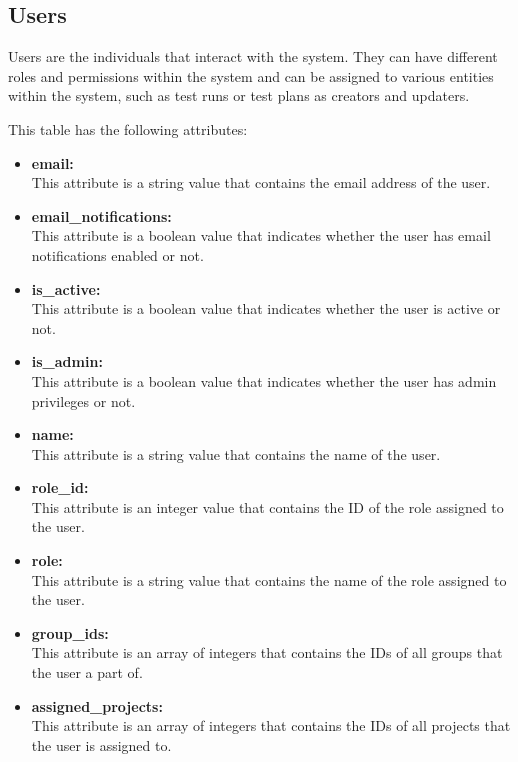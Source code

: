 \subsection{Users}

Users are the individuals that interact with the system. They can have different roles and permissions within the system and can be assigned to various entities within the system, such as test runs or test plans as creators and updaters.

This table has the following attributes:~\cite{TRUsers}
\begin{itemize}
    \item \textbf{email:} \\
    This attribute is a string value that contains the email address of the user.

    \item \textbf{email_notifications:} \\
    This attribute is a boolean value that indicates whether the user has email notifications enabled or not.

    \item \textbf{is_active:} \\
    This attribute is a boolean value that indicates whether the user is active or not.

    \item \textbf{is_admin:} \\
    This attribute is a boolean value that indicates whether the user has admin privileges or not.

    \item \textbf{name:} \\
    This attribute is a string value that contains the name of the user.

    \item \textbf{role_id:} \\
    This attribute is an integer value that contains the ID of the role assigned to the user.

    \item \textbf{role:} \\
    This attribute is a string value that contains the name of the role assigned to the user.

    \item \textbf{group_ids:} \\
    This attribute is an array of integers that contains the IDs of all groups that the user a part of.

    \item \textbf{assigned_projects:} \\
    This attribute is an array of integers that contains the IDs of all projects that the user is assigned to.


\end{itemize}
